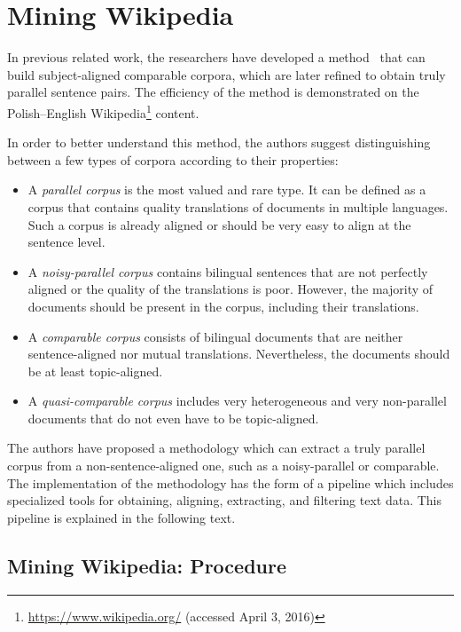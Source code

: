 \section{Mining Wikipedia}
\label{section:mining_wikipedia}

In previous related work, the researchers have developed a method~\cite{Wolk14} that can build subject-aligned comparable corpora, which are later refined to obtain truly parallel sentence pairs. The efficiency of the method is demonstrated on the Polish--English Wikipedia\footnote{\url{https://www.wikipedia.org/} (accessed April 3, 2016)} content. 

In order to better understand this method, the authors suggest distinguishing between a few types of corpora according to their properties:

\begin{itemize}
	\item A \textit{parallel corpus} is the most valued and rare type. It can be defined as a corpus that contains quality translations of documents in multiple languages. Such a corpus is already aligned or should be very easy to align at the sentence level.

	\item A \textit{noisy-parallel corpus} contains bilingual sentences that are not perfectly aligned or the quality of the translations is poor. However, the majority of documents should be present in the corpus, including their translations.
	
	\item A \textit{comparable corpus} consists of bilingual documents that are neither sentence-aligned nor mutual translations. Nevertheless, the documents should be at least topic-aligned.
	
	\item A \textit{quasi-comparable corpus} includes very heterogeneous and very non-parallel documents that do not even have to be topic-aligned. 
\end{itemize}

The authors have proposed a methodology which can extract a truly parallel corpus from a non-sentence-aligned one, such as a noisy-parallel or comparable. The implementation of the methodology has the form of a pipeline which includes specialized tools for obtaining, aligning, extracting, and filtering text data. This pipeline is explained in the following text.

\subsection{Mining Wikipedia: Procedure}
\label{subsection:mining_wikipedia_procedure}

